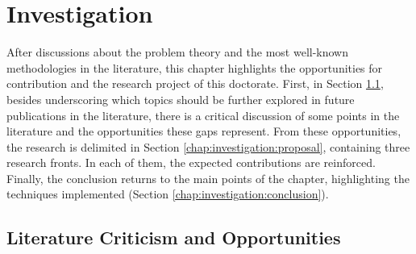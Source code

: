 
\chapter{Investigation}\label{chap:investigation}

	After discussions about the problem theory and the most well-known methodologies in the literature, this chapter highlights the opportunities for contribution and the research project of this doctorate. First, in Section \ref{chap:investigation:criticism}, besides underscoring which topics should be further explored in future publications in the literature, there is a critical discussion of some points in the literature and the opportunities these gaps represent. From these opportunities, the research is delimited in Section \ref{chap:investigation:proposal}, containing three research fronts. In each of them, the expected contributions are reinforced. Finally, the conclusion returns to the main points of the chapter, highlighting the techniques implemented (Section \ref{chap:investigation:conclusion}).

	\section{Literature Criticism and Opportunities}\label{chap:investigation:criticism}
	
